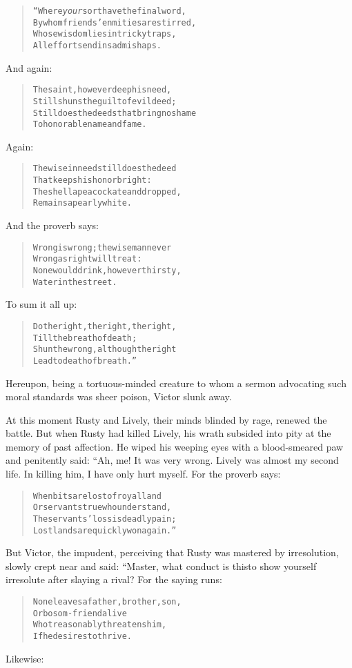 \documentclass[article, twoside, 14pt]{memoir}
\renewenvironment{verbatim}{%
\begin{quote}%
\vskip -10pt%
\begin{alltt}\normalfont\large}{\end{alltt}%
\end{quote}%
\vskip -10pt
} %
\begin{document}
\begin{verbatim}
“Where \emph{your} sort have the final word,
By whom friends' enmities are stirred,
Whose wisdom lies in tricky traps,
All efforts end in sad mishaps.
\end{verbatim}
And again:

\begin{verbatim}
The saint, however deep his need,
Still shuns the guilt of evil deed;
Still does the deeds that bring no shame
To honorable name and fame.
\end{verbatim}
Again:

\begin{verbatim}
The wise in need still does the deed
    That keeps his honor bright:
The shell a peacock ate and dropped,
    Remains a pearly white.
\end{verbatim}
And the proverb says:

\begin{verbatim}
Wrong is wrong; the wise man never
    Wrong as right will treat:
None would drink, however thirsty,
    Water in the street.
\end{verbatim}
To sum it all up:

\begin{verbatim}
Do the right, the right, the right,
    Till the breath of death;
Shun the wrong, although the right
    Lead to death of breath.”
\end{verbatim}
Hereupon, being a tortuous-minded creature to whom a sermon
advocating such moral standards was sheer poison, Victor slunk
away.

At this moment Rusty and Lively, their minds blinded by rage,
renewed the battle. But when Rusty had killed Lively, his wrath
subsided into pity at the memory of past affection. He wiped his
weeping eyes with a blood-smeared paw and penitently said: “Ah, me!
It was very wrong. Lively was almost my second life. In killing
him, I have only hurt myself. For the proverb says:

\begin{verbatim}
When bits are lost of royal land
Or servants true who understand,
The servants' loss is deadly pain;
Lost lands are quickly won again.”
\end{verbatim}
But Victor, the impudent, perceiving that Rusty was mastered by
irresolution, slowly crept near and said: “Master, what conduct is
this{\textemdash}to show yourself irresolute after slaying a rival? For the
saying runs:

\begin{verbatim}
None leaves a father, brother, son,
    Or bosom-friend alive
Who treasonably threatens him,
    If he desires to thrive.
\end{verbatim}
Likewise:
\end{document}
